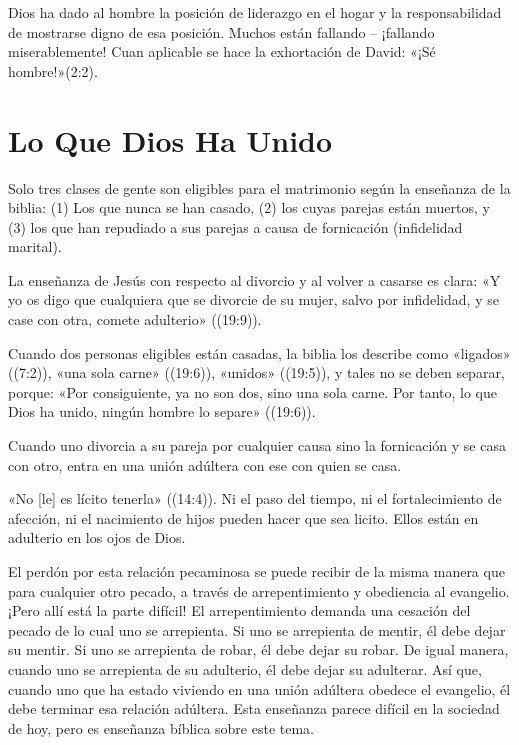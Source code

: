 \documentclass[12pt, twoside, openright]{book}
\begin{document}
Dios ha dado al hombre la posición de liderazgo en el hogar y la responsabilidad de mostrarse digno de esa posición. Muchos están fallando – ¡fallando miserablemente! Cuan aplicable se hace la exhortación de David: «¡Sé hombre!»(2:2).

\section{Lo Que Dios Ha Unido}
Solo tres clases de gente son eligibles para el matrimonio según la enseñanza de la biblia: (1) Los que nunca se han casado, (2) los cuyas parejas están muertos, y (3) los que han repudiado a sus parejas a causa de fornicación (infidelidad marital).

La enseñanza de Jesús con respecto al divorcio y al volver a casarse es clara: «Y yo os digo que cualquiera que se divorcie de su mujer, salvo por infidelidad, y se case con otra, comete adulterio» ((19:9)). 

Cuando dos personas eligibles están casadas, la biblia los describe como «ligados» ((7:2)), «una sola carne» ((19:6)), «unidos» ((19:5)), y tales no se deben separar, porque: «Por consiguiente, ya no son dos, sino una sola carne. Por tanto, lo que Dios ha unido, ningún hombre lo separe» ((19:6)). 

Cuando uno divorcia a su pareja por cualquier causa sino la fornicación y se casa con otro, entra en una unión adúltera con ese con quien se casa.

«No [le] es lícito tenerla» ((14:4)). Ni el paso del tiempo, ni el fortalecimiento de afección, ni el nacimiento de hijos pueden hacer que sea licito. Ellos están en adulterio en los ojos de Dios.

El perdón por esta relación pecaminosa se puede recibir de la misma manera que para cualquier otro pecado, a través de arrepentimiento y obediencia al evangelio. ¡Pero allí está la parte difícil! El arrepentimiento demanda una cesación del pecado de lo cual uno se arrepienta. Si uno se arrepienta de mentir, él debe dejar su mentir. Si uno se arrepienta de robar, él debe dejar su robar. De igual manera, cuando uno se arrepienta de su adulterio, él debe dejar su adulterar. Así que, cuando uno que ha estado viviendo en una unión adúltera obedece el evangelio, él debe terminar esa relación adúltera. Esta enseñanza parece difícil en la sociedad de hoy, pero es enseñanza bíblica sobre este tema.
\end{document}

